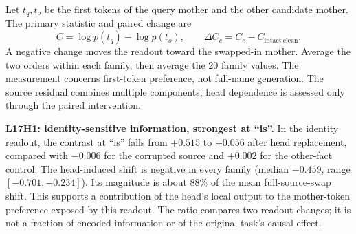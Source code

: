 \documentclass[11pt,a4paper]{article}
\begin{document}
Let $t_q,t_o$ be the first tokens of the query mother and the other candidate mother.
The primary statistic and paired change are
\[
 C=\log p(t_q)-\log p(t_o),\qquad
 \Delta C_c=C_c-C_{\mathrm{intact\ clean}}.
\]
A negative change moves the readout toward the swapped-in mother. Average the two
orders within each family, then average the 20 family values. The measurement concerns
first-token preference, not full-name generation. The source residual combines
multiple components; head dependence is assessed only through the paired intervention.

\begin{table}[htbp]
\centering\small
\setlength{\tabcolsep}{4pt}
\caption{Controlled readout, family-level descriptives. Source swap uses the intact
corrupted prompt; head-site replaces only the selected head at the capture position.
The last column counts families with a negative head-site change after averaging
orders. The head-span condition is identical by construction at this capture layer
(see below). Values come from \texttt{readout\_family\_summary.csv}.}
\label{tab:readout}
\end{table}

\textbf{L17H1: identity-sensitive information, strongest at ``is''.} In the identity
readout, the contrast at ``is'' falls from $+0.515$ to $+0.056$ after head replacement,
compared with $-0.006$ for the corrupted source and $+0.002$ for the other-fact control.
The head-induced shift is negative in every family (median $-0.459$, range
$[-0.701,-0.234]$). Its magnitude is about 88\% of the mean full-source-swap shift.
This supports a contribution of the head's local output to the mother-token
preference exposed by this readout. The ratio compares two readout changes; it is
not a fraction of encoded information or of the original task's causal effect.
\end{document}
